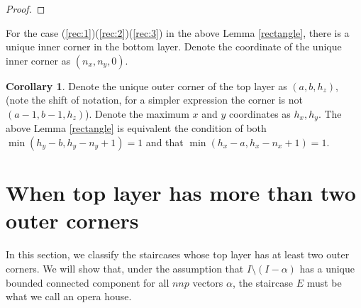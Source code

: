 \documentclass{amsart}[10pt]
\theoremstyle{plain}
\theoremstyle{definition}
\newtheorem{corollary}[theorem]{Corollary}
\begin{document}
\begin{proof}




\end{proof}

For the case (\ref{rec:1})(\ref{rec:2})(\ref{rec:3}) in the above Lemma \ref{rectangle}, there is a unique inner corner in the bottom layer. Denote the coordinate of the unique inner corner as $(n_x, n_y,0)$. 
\begin{corollary}
\label{equiv_cond_rec}
Denote the unique outer corner of the top layer as $(a,b,h_z)$, (note the shift of notation, for a simpler expression the corner is not $(a-1, b-1, h_z)$). Denote the maximum $x$ and $y$ coordinates as $h_x, h_y$. The above Lemma \ref{rectangle} is equivalent the condition of both $\min(h_y-b, h_y-n_y+1)=1$ and that $\min(h_x-a, h_x-n_x+1)=1$.   
\end{corollary}

\section{When top layer has more than two outer corners}

In this section, we classify the staircases whose top layer has at least two
outer corners. We will show that, under the assumption that
$I \setminus (I - \alpha)$ has a unique bounded connected component for all $nnp$ vectors $\alpha$, the staircase $E$ must be what we call an opera house.

\end{document}
